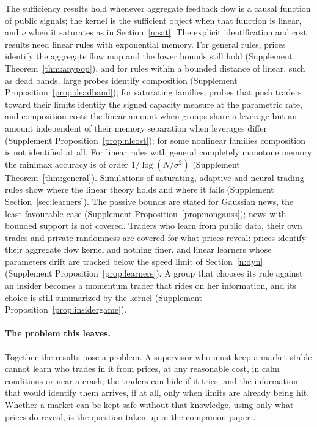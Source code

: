 \documentclass[12pt]{article}
\theoremstyle{definition}
\theoremstyle{remark}
\begin{document}
The sufficiency results hold whenever aggregate feedback flow is a causal function of public signals; the kernel is the sufficient object when that function is linear, and $\nu$ when it saturates as in Section~\ref{n:sat}. The explicit identification and cost results need linear rules with exponential memory. For general rules, prices identify the aggregate flow map and the lower bounds still hold (Supplement Theorem~\ref{thm:anypop}), and for rules within a bounded distance of linear, such as dead bands, large probes identify composition (Supplement Proposition~\ref{prop:deadband}); for saturating families, probes that push traders toward their limits identify the signed capacity measure at the parametric rate, and composition costs the linear amount when groups share a leverage but an amount independent of their memory separation when leverages differ (Supplement Proposition~\ref{prop:nlcost}); for some nonlinear families composition is not identified at all. For linear rules with general completely monotone memory the minimax accuracy is of order $1/\log(N/\sigma^2)$ (Supplement Theorem~\ref{thm:general}). Simulations of saturating, adaptive and neural trading rules show where the linear theory holds and where it fails (Supplement Section~\ref{sec:learners}). The passive bounds are stated for Gaussian news, the least favourable case (Supplement Proposition~\ref{prop:nongauss}); news with bounded support is not covered. Traders who learn from public data, their own trades and private randomness are covered for what prices reveal: prices identify their aggregate flow kernel and nothing finer, and linear learners whose parameters drift are tracked below the speed limit of Section~\ref{n:dyn} (Supplement Proposition~\ref{prop:learners}). A group that chooses its rule against an insider becomes a momentum trader that rides on her information, and its choice is still summarized by the kernel (Supplement Proposition~\ref{prop:insidergame}).

\paragraph{The problem this leaves.} Together the results pose a problem. A supervisor who must keep a market stable cannot learn who trades in it from prices, at any reasonable cost, in calm conditions or near a crash; the traders can hide if it tries; and the information that would identify them arrives, if at all, only when limits are already being hit. Whether a market can be kept safe without that knowledge, using only what prices do reveal, is the question taken up in the companion paper \citep{niroula2026b}.
\end{document}
